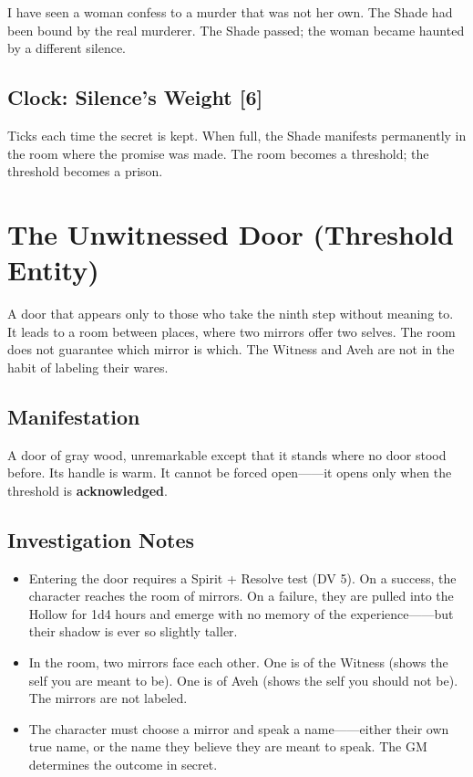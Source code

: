 I have seen a woman confess to a murder that was not her own. The Shade had been bound by the real murderer. The Shade passed; the woman became haunted by a different silence.

\subsection{Clock: Silence's Weight [6]}

Ticks each time the secret is kept. When full, the Shade manifests permanently in the room where the promise was made. The room becomes a threshold; the threshold becomes a prison.

\section{The Unwitnessed Door (Threshold Entity)}

A door that appears only to those who take the ninth step without meaning to. It leads to a room between places, where two mirrors offer two selves. The room does not guarantee which mirror is which. The Witness and Aveh are not in the habit of labeling their wares.

\subsection{Manifestation}

A door of gray wood, unremarkable except that it stands where no door stood before. Its handle is warm. It cannot be forced open------it opens only when the threshold is \textbf{acknowledged}.

\subsection{Investigation Notes}

\begin{itemize}
    \item Entering the door requires a Spirit + Resolve test (DV 5). On a success, the character reaches the room of mirrors. On a failure, they are pulled into the Hollow for 1d4 hours and emerge with no memory of the experience------but their shadow is ever so slightly taller.
    \item In the room, two mirrors face each other. One is of the Witness (shows the self you are meant to be). One is of Aveh (shows the self you should not be). The mirrors are not labeled.
    \item The character must choose a mirror and speak a name------either their own true name, or the name they believe they are meant to speak. The GM determines the outcome in secret.
\end{itemize}

